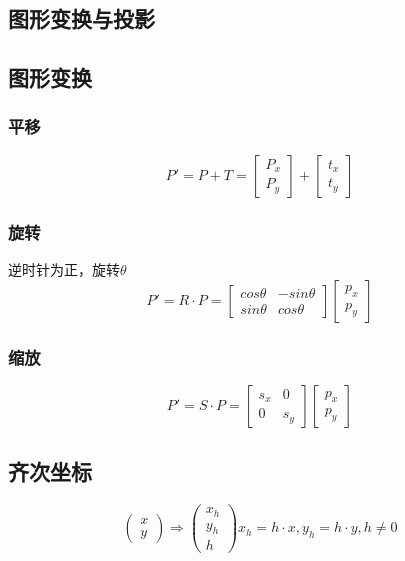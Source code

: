 \documentclass{article}
\begin{document}
\begin{CJK}{UTF8}{gbsn}
	\section{图形变换与投影}
	\subsection{图形变换}
	\subsubsection{平移}
	$$
	P'=P+T=\begin{bmatrix}
	P_x\\
	P_y\end{bmatrix}
	+\begin{bmatrix}
	t_x\\t_y
	\end{bmatrix}
	$$
	\subsubsection{旋转}
	逆时针为正，旋转$\theta$\\
	$$
	P'=R\cdot P=\begin{bmatrix}
	cos\theta&-sin\theta\\sin\theta&cos\theta
	\end{bmatrix}
	\begin{bmatrix}
	p_x\\p_y
	\end{bmatrix}
	$$
	\subsubsection{缩放}
	$$P'=S\cdot P=\begin{bmatrix}
	s_x&0\\0&s_y
	\end{bmatrix}
	\begin{bmatrix}
	p_x\\p_y
	\end{bmatrix}
	$$
	\subsection{齐次坐标}
	$$
	\begin{pmatrix}
		x\\y
	\end{pmatrix}
	\Rightarrow\begin{pmatrix}
		x_h\\y_h\\h
	\end{pmatrix}
	x_h=h\cdot x,y_h=h\cdot y,h\neq 0
	$$

\end{CJK}
\end{document}
